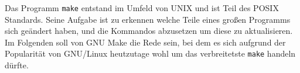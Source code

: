 Das Programm \texttt{make} entstand im Umfeld von UNIX und ist Teil des POSIX
Standards.  Seine Aufgabe ist zu erkennen welche Teile eines großen Programms
sich geändert haben, und die Kommandos abzusetzen um diese zu aktualisieren.
%
Im Folgenden soll von GNU Make die Rede sein, bei dem es sich aufgrund der
Popularität von GNU/Linux heutzutage wohl um das verbreitetste \texttt{make}
handeln dürfte.
